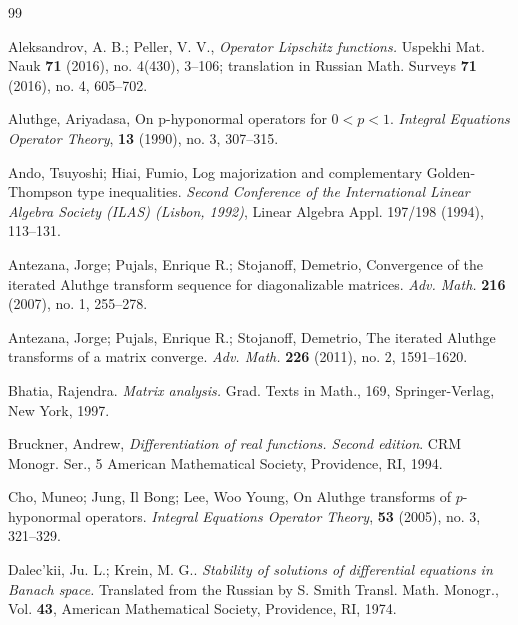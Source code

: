 \documentclass[12pt]{article}
\theoremstyle{definition}
\numberwithin{equation}{section}
\begin{document}
\begin{thebibliography}{99}



Aleksandrov, A. B.; Peller, V. V., 
\textit{Operator Lipschitz functions.} 
Uspekhi Mat. Nauk \textbf{71} (2016), no. 4(430), 3--106; 
translation in Russian Math. Surveys \textbf{71} (2016), no. 4, 605--702. 


 Aluthge, Ariyadasa, 
On p-hyponormal operators for $0<p<1$. 
\textit{Integral Equations Operator Theory}, 
\textbf{13} (1990), no. 3, 307--315.




 Ando, Tsuyoshi; Hiai, Fumio, 
Log majorization and complementary Golden-Thompson type inequalities. 
\textit{Second Conference of the International Linear Algebra Society (ILAS) (Lisbon, 1992)}, 
Linear Algebra Appl. 197/198 (1994), 113--131.


 Antezana, Jorge; Pujals, Enrique R.; Stojanoff, Demetrio,  
Convergence of the iterated Aluthge transform sequence for diagonalizable matrices. 
\textit{Adv. Math.} \textbf{216} (2007), no. 1, 255--278.

 Antezana, Jorge; Pujals, Enrique R.; Stojanoff, Demetrio,  
The iterated Aluthge transforms of a matrix converge. 
\textit{Adv. Math.} \textbf{226} (2011), no. 2, 1591--1620.


 Bhatia, Rajendra. 
\textit{Matrix analysis.}
Grad. Texts in Math., 169, Springer-Verlag, New York, 1997.



Bruckner, Andrew, 
\textit{Differentiation of real functions.
Second edition}.  
CRM Monogr. Ser., 5
American Mathematical Society, Providence, RI, 1994. 



 Cho, Muneo; Jung, Il Bong; Lee, Woo Young, 
On Aluthge transforms of $p$-hyponormal operators. 
\textit{Integral Equations Operator Theory}, \textbf{53} (2005), no. 3, 321--329.

Dalec'kii, Ju. L.; Krein, M. G.. 
\textit{Stability of solutions of differential equations in Banach space.} 
Translated from the Russian by S. Smith
Transl. Math. Monogr., Vol. \textbf{43}, 
American Mathematical Society, Providence, RI, 1974.



\end{thebibliography}
\end{document}
